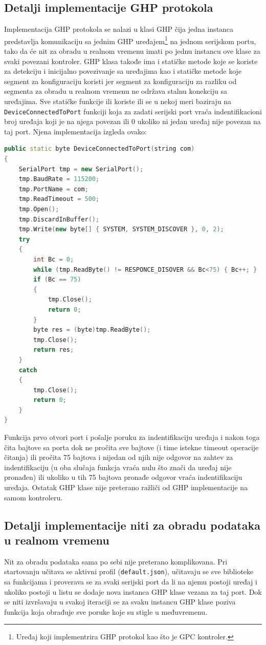 \documentclass[12pt,oneside]{memoir}
\begin{document}
	\subsection{Detalji implementacije GHP protokola}
	Implementacija GHP protokola se nalazi u klasi GHP čija jedna instanca predstavlja komunikaciju sa jednim GHP uređajem\footnote{Uređaj koji implementrira GHP protokol kao što je GPC kontroler.} na jednom serijskom portu, tako da će nit za obradu u realnom vremenu imati po jednu instancu ove klase za svaki povezani kontroler. GHP klasa takođe ima i statičke metode koje se koriste za detekciju i inicijalno povezivanje sa uređajima kao i statičke metode koje segment za konfiguraciju koristi jer segment za konfiguraciju za razliku od segmenta za obradu u realnom vremenu ne održava stalnu konekciju sa uređajima. Sve statičke funkcije ili koriste ili se u nekoj meri baziraju na \verb|DeviceConnectedToPort| funkciji koja za zadati serijski port vraća indentifikacioni broj uređaja koji je na njega povezan ili 0 ukoliko ni jedan uređaj nije povezan na taj port. Njena implementacija izgleda ovako:
	\begin{lstlisting}[language=C++,tabsize=2]
public static byte DeviceConnectedToPort(string com)
{
	SerialPort tmp = new SerialPort();
	tmp.BaudRate = 115200;
	tmp.PortName = com;
	tmp.ReadTimeout = 500;
	tmp.Open();
	tmp.DiscardInBuffer();
	tmp.Write(new byte[] { SYSTEM, SYSTEM_DISCOVER }, 0, 2);
	try
	{
		int Bc = 0;
		while (tmp.ReadByte() != RESPONCE_DISOVER && Bc<75) { Bc++; }
		if (Bc == 75)
		{
			tmp.Close();
			return 0;
		}
		byte res = (byte)tmp.ReadByte();
		tmp.Close();
		return res;
	}
	catch
	{
		tmp.Close();
		return 0;
	}
}
	\end{lstlisting}
	Funkcija prvo otvori port i pošalje poruku za indentifikaciju uređaja i nakon toga čita bajtove sa porta dok ne pročita sve bajtove (i time istekne timeout operacije čitanja) ili pročita 75 bajtova i nijedan od njih nije odgovor na zahtev za indentifikaciju (u oba slučaja funkcja vraća nulu što znači da uređaj nije pronađen) ili ukoliko u tih 75 bajtova pronađe odgovor vraća indentifikaciju uređaja. Ostatak GHP klase nije preterano ražliči od GHP implementacije na samom kontroleru.
	\subsection{Detalji implementacije niti za obradu podataka u realnom vremenu}
	Nit za obradu podataka sama po sebi nije preterano komplikovana. Pri startovanju učitava se aktivni profil (\verb|default.json|), učitavaju se sve biblioteke sa funkcijama i proverava se za svaki serijski port da li na njemu postoji uređaj i ukoliko postoji u listu se dodaje nova instanca GHP klase vezana za taj port. Dok se niti izvršavaju u svakoj iteraciji se za svaku instancu GHP klase poziva funkcija koja obrađuje sve poruke koje su stigle u međuvremenu.
\end{document}
